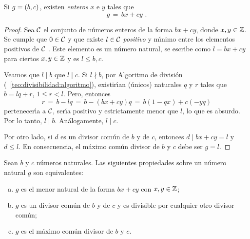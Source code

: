 \begin{teoDivisibilidad}\label{teo:mcd:bezout}
	Si $g=\mcd{b,c}$, existen \emph{enteros} $x$ e $y$ tales que
	\begin{displaymath}
		g\,=\,bx+cy
		\text{ .}
	\end{displaymath}
\end{teoDivisibilidad}

\begin{proof}
	Sea $\cal C$ el conjunto de n\'umeros enteros de la forma $bx+cy$,
	donde $x,y\in\Enteros$. Se cumple que $0\in\cal C$ y que existe
	$l\in\cal C$ \emph{positivo} y m\'{\i}nimo entre los elementos
	positivos de $\cal C$ \quedacomoejercicio.
	Este elemento es un n\'umero natural, se escribe como $l=bx+cy$ para
	ciertos $x,y\in\Enteros$ y es $l\leq b,c$.

	Veamos que $l\mid b$  que $l\mid c$. Si $l\nmid b$, por Algoritmo de
	divisi\'on (\teoname~\ref{teo:divisibilidad:algoritmo}),
	existir\'{\i}an (\'unicos) naturales $q$ y $r$ tales que $b=lq+r$,
	$1\leq r<l$. Pero, entonces
	\begin{displaymath}
		r\,=\,b-lq\,=\,b-(bx+cy)q\,=\,b(1-qx)+c(-yq)
	\end{displaymath}
	pertenecer\'{\i}a a $\cal C$, ser\'{\i}a positivo y estrictamente
	menor que $l$, lo que es absurdo. Por lo tanto, $l\mid b$.
	An\'alogamente, $l\mid c$.

	Por otro lado, si $d$ es un divisor com\'un de $b$ y de $c$, entonces
	$d\mid bx+cy=l$ y $d\leq l$. En consecuencia, el m\'aximo com\'un
	divisor de $b$ y $c$ debe ser $g=l$.
\end{proof}

\begin{coroDivisibilidad}\label{coro:mcd:caracterizacion}
	Sean $b$ y $c$ n\'umeros naturales. Las siguientes propiedades sobre
	un n\'umero natural $g$ son equivalentes:
	\begin{enumerate}[(a)]
		\item\label{item:coro:mcd:caracterizacion:a}
			$g$ es el menor natural de la forma $bx+cy$ con
			$x,y\in\Enteros$;
		\item\label{item:coro:mcd:caracterizacion:b}
			$g$ es un divisor com\'un de $b$ y de $c$ y es
			divisible por cualquier otro divisor com\'un;
		\item\label{item:coro:mcd:caracterizacion:c}
			$g$ es el m\'aximo com\'un divisor de $b$ y $c$.
	\end{enumerate}
\end{coroDivisibilidad}


